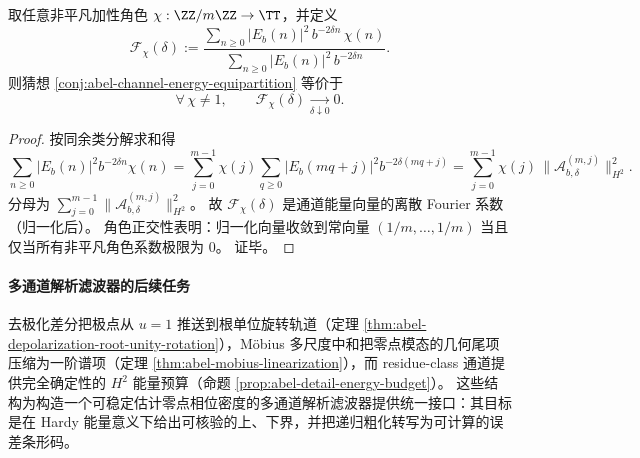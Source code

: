 \begin{proposition}[字符谱等价刻画]\label{prop:abel-channel-equipartition-character}
取任意非平凡加性角色 \(\chi:\ZZ/m\ZZ\to\TT\)，并定义
\[
\boxed{\ \mathcal F_\chi(\delta):=
\frac{\sum_{n\ge 0}|E_b(n)|^2\,b^{-2\delta n}\,\chi(n)}
{\sum_{n\ge 0}|E_b(n)|^2\,b^{-2\delta n}}.\ }
\]
则猜想 \ref{conj:abel-channel-energy-equipartition} 等价于
\[
\forall\,\chi\neq 1,\qquad \mathcal F_\chi(\delta)\xrightarrow[\delta\downarrow 0]{}0.
\]
\end{proposition}
\begin{proof}
按同余类分解求和得
\[
\sum_{n\ge 0}|E_b(n)|^2b^{-2\delta n}\chi(n)
=\sum_{j=0}^{m-1}\chi(j)\sum_{q\ge 0}|E_b(mq+j)|^2b^{-2\delta(mq+j)}
=\sum_{j=0}^{m-1}\chi(j)\,\|\mathcal A_{b,\delta}^{(m,j)}\|_{H^2}^2.
\]
分母为 \(\sum_{j=0}^{m-1}\|\mathcal A_{b,\delta}^{(m,j)}\|_{H^2}^2\)。
故 \(\mathcal F_\chi(\delta)\) 是通道能量向量的离散 Fourier 系数（归一化后）。
角色正交性表明：归一化向量收敛到常向量 \((1/m,\dots,1/m)\) 当且仅当所有非平凡角色系数极限为 \(0\)。
证毕。
\end{proof}

\paragraph{多通道解析滤波器的后续任务}
去极化差分把极点从 \(u=1\) 推送到根单位旋转轨道（定理 \ref{thm:abel-depolarization-root-unity-rotation}），Möbius 多尺度中和把零点模态的几何尾项压缩为一阶谱项（定理 \ref{thm:abel-mobius-linearization}），而 residue-class 通道提供完全确定性的 \(H^2\) 能量预算（命题 \ref{prop:abel-detail-energy-budget}）。
这些结构为构造一个可稳定估计零点相位密度的多通道解析滤波器提供统一接口：其目标是在 Hardy 能量意义下给出可核验的上、下界，并把递归粗化转写为可计算的误差条形码。

\endinput

